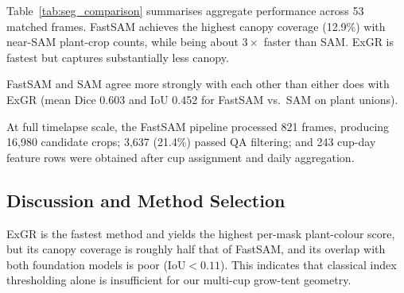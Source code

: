 Table~\ref{tab:seg_comparison} summarises aggregate performance across 53 matched frames.
FastSAM achieves the highest canopy coverage (12.9\%) with near-SAM plant-crop counts, while
being about $3\times$ faster than SAM. ExGR is fastest but captures substantially less canopy.

\begin{table}[t]
    \centering
    \caption{Segmentation comparison on 53 matched trial-day frames (aggregate means).}
    \label{tab:seg_comparison}
    \small
\end{table}

FastSAM and SAM agree more strongly with each other than either does with ExGR (mean Dice
0.603 and IoU 0.452 for FastSAM vs.\ SAM on plant unions).

At full timelapse scale, the FastSAM pipeline processed 821 frames, producing 16{,}980
candidate crops; 3{,}637 (21.4\%) passed QA filtering; and 243 cup-day feature rows were
obtained after cup assignment and daily aggregation.

\subsection{Discussion and Method Selection}
\label{sec:discussion_selection}

ExGR is the fastest method and yields the highest per-mask plant-colour score, but its canopy
coverage is roughly half that of FastSAM, and its overlap with both foundation models is poor
($\mathrm{IoU} < 0.11$).
This indicates that classical index thresholding alone is insufficient for our multi-cup
grow-tent geometry.

